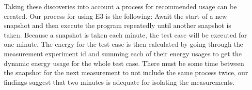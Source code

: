 Taking these discoveries into account a process for recommended usage can be created. Our process for using E3 is the following: Await the start of a new snapshot and then execute the program repeatedly until another snapshot is taken. Because a snapshot is taken each minute, the test case will be executed for one minute. The energy for the test case is then calculated by going through the measurement experiment id and summing each of their energy usages to get the dynamic energy usage for the whole test case. There must be some time between the snapshot for the next measurement to not include the same process twice, our findings suggest that two minutes is adequate for isolating the measurements.    